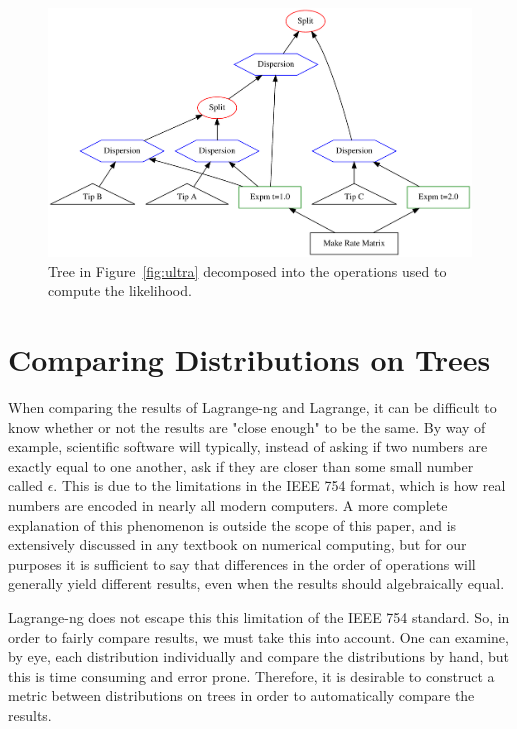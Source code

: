\documentclass{article}
\begin{document}
\begin{figure}
  \centering
  \includegraphics[width=\linewidth]{figures/full-operations.pdf}
  \caption{Tree in Figure~\ref{fig:ultra} decomposed into the operations used to compute the likelihood.}
  \label{fig:full-operations}
\end{figure}

\section{Comparing Distributions on Trees}

When comparing the results of Lagrange-ng and Lagrange, it can be difficult to know whether or not the results are
"close enough" to be the same. By way of example, scientific software will typically, instead of asking if two numbers
are exactly equal to one another, ask if they are closer than some small number called $\epsilon$. This is due to the
limitations in the IEEE 754 format, which is how real numbers are encoded in nearly all modern computers. A more
complete explanation of this phenomenon is outside the scope of this paper, and is extensively discussed in any textbook
on numerical computing, but for our purposes it is sufficient to say that differences in the order of operations will
generally yield different results, even when the results should algebraically equal.

Lagrange-ng does not escape this this limitation of the IEEE 754 standard. So, in order to fairly compare results, we
must take this into account. One can examine, by eye, each distribution individually and compare the distributions by
hand, but this is time consuming and error prone. Therefore, it is desirable to construct a metric between distributions
on trees in order to automatically compare the results.
\end{document}
